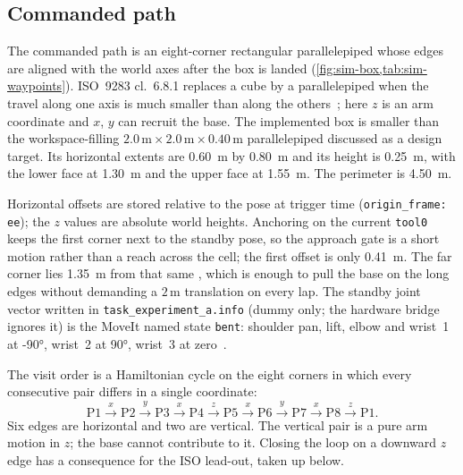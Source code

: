 \subsection{Commanded path}
\label{sec:sim-path}

The commanded path is an eight-corner rectangular parallelepiped whose
edges are aligned with the world axes after the box is landed
(\cref{fig:sim-box,tab:sim-waypoints}). ISO~9283 cl.~6.8.1 replaces a
cube by a parallelepiped when the travel along one axis is much smaller
than along the others~\cite{ISO9283}; here $z$ is an arm coordinate and
$x$, $y$ can recruit the base. The implemented box is smaller than the
workspace-filling $2.0\,\mathrm{m}\times 2.0\,\mathrm{m}\times
0.40\,\mathrm{m}$ parallelepiped discussed as a design target. Its
horizontal extents are \qty{0.60}{\meter} by \qty{0.80}{\meter} and its
height is \qty{0.25}{\meter}, with the lower face at
\qty{1.30}{\meter} and the upper face at \qty{1.55}{\meter}. The
perimeter is \qty{4.50}{\meter}.

Horizontal offsets are stored relative to the \ee{} pose at trigger
time (\texttt{origin\_frame: ee}); the $z$ values are absolute world
heights. Anchoring on the current \texttt{tool0} keeps the first corner
next to the standby pose, so the approach gate is a short motion rather
than a reach across the cell; the first offset is only
\qty{0.41}{\meter}. The far corner lies \qty{1.35}{\meter} from
that same \ee{}, which is enough to pull the base on the long edges
without demanding a $2\,\mathrm{m}$ translation on every lap. The
standby joint vector written in \texttt{task\_experiment\_a.info} (dummy
only; the hardware bridge ignores it) is the MoveIt named state
\texttt{bent}: shoulder pan, lift, elbow and wrist~1 at \ang{-90},
wrist~2 at \ang{+90}, wrist~3 at zero~\cite{moveit2}.

The visit order is a Hamiltonian cycle on the eight corners in which
every consecutive pair differs in a single coordinate:
\begin{equation*}
  \mathrm{P1}
    \xrightarrow{x}\mathrm{P2}
    \xrightarrow{y}\mathrm{P3}
    \xrightarrow{x}\mathrm{P4}
    \xrightarrow{z}\mathrm{P5}
    \xrightarrow{x}\mathrm{P6}
    \xrightarrow{y}\mathrm{P7}
    \xrightarrow{x}\mathrm{P8}
    \xrightarrow{z}\mathrm{P1}.
\end{equation*}
Six edges are horizontal and two are vertical. The vertical pair is a
pure arm motion in $z$; the base cannot contribute to it. Closing the
loop on a downward $z$ edge has a consequence for the ISO lead-out,
taken up below.

